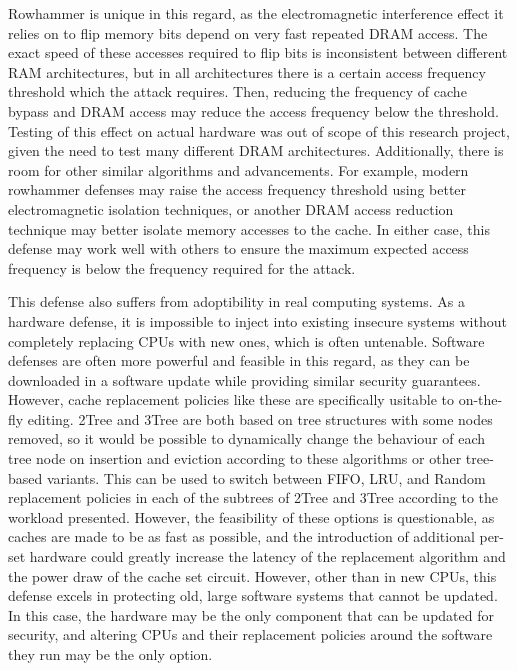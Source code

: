 \documentclass[letterpaper]{article}
\begin{document}
Rowhammer is unique in this regard, as the electromagnetic interference effect
it relies on to flip memory bits depend on very fast repeated DRAM access.
The exact speed of these accesses required to flip bits is inconsistent between
different RAM architectures,
but in all architectures there is a certain access frequency threshold
which the attack requires.
Then, reducing the frequency of cache bypass and DRAM access may reduce the access frequency
below the threshold.
Testing of this effect on actual hardware was out of scope of this research project,
given the need to test many different DRAM architectures.
Additionally, there is room for other similar algorithms and advancements.
For example, modern rowhammer defenses may raise the access frequency threshold
using better electromagnetic isolation techniques,
or another DRAM access reduction technique may better isolate memory accesses to the cache.
In either case, this defense may work well with others
to ensure the maximum expected access frequency is below the frequency required for the attack.

This defense also suffers from adoptibility in real computing systems.
As a hardware defense, it is impossible to inject into existing insecure systems
without completely replacing CPUs with new ones, which is often untenable.
Software defenses are often more powerful and feasible in this regard,
as they can be downloaded in a software update while providing similar security guarantees.
However, cache replacement policies like these are specifically usitable to on-the-fly editing.
2Tree and 3Tree are both based on tree structures with some nodes removed,
so it would be possible to dynamically change the behaviour of each tree node
on insertion and eviction according to these algorithms or other tree-based variants.
This can be used to switch between FIFO, LRU, and Random replacement policies
in each of the subtrees of 2Tree and 3Tree according to the workload presented.
However, the feasibility of these options is questionable,
as caches are made to be as fast as possible,
and the introduction of additional per-set hardware
could greatly increase the latency of the replacement algorithm
and the power draw of the cache set circuit.
However, other than in new CPUs, this defense excels in protecting old, large software systems
that cannot be updated.
In this case, the hardware may be the only component that can be updated for security,
and altering CPUs and their replacement policies around the software they run
may be the only option.
\end{document}
